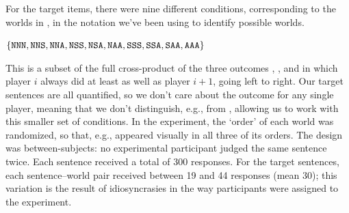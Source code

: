 \documentclass[leqno]{article}
\begin{document}
For the target items, there were nine different conditions,
corresponding to the worlds in , in the notation we've been
using to identify possible worlds.
%
\begin{examples}
\item\label{conds} $\left\{ \texttt{NNN}, \texttt{NNS}, \texttt{NNA},
    \texttt{NSS}, \texttt{NSA}, \texttt{NAA}, \texttt{SSS}, \texttt{SSA},
    \texttt{SAA}, \texttt{AAA} \right\}$
\end{examples}


This is a subset of the full cross-product of the three outcomes
, , and  in which player $i$ always did at
least as well as player $i+1$, going left to right.  Our target
sentences are all quantified, so we don't care about the outcome for
any single player, meaning that we don't distinguish, e.g.,
 from , allowing us to work with this smaller
set of conditions. In the experiment, the `order' of each world was
randomized, so that, e.g.,  appeared visually in all three
of its orders.  The design was between-subjects: no experimental
participant judged the same sentence twice. Each sentence received a
total of 300 responses. For the target sentences, each sentence--world
pair received between 19 and 44 responses (mean 30); this variation is
the result of idiosyncrasies in the way participants were assigned to
the experiment.

\end{document}
